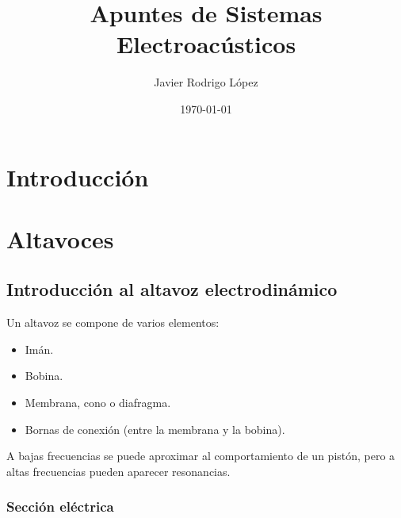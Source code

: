 \documentclass[12pt, a4paper]{article}
\title{Apuntes de Sistemas Electroacústicos}
\author{Javier Rodrigo López}
\date{\today}
\begin{document}
\maketitle

\tableofcontents

\newpage
\section*{Introducción}

\section{Altavoces}

\subsection{Introducción al altavoz electrodinámico}


Un altavoz se compone de varios elementos:

\begin{itemize}
  \item Imán.
  \item Bobina.
  \item Membrana, cono o diafragma.
  \item Bornas de conexión (entre la membrana y la bobina).
\end{itemize}

A bajas frecuencias se puede aproximar al comportamiento de un pistón, pero a altas frecuencias pueden aparecer resonancias.

\subsubsection{Sección eléctrica}
\end{document}
